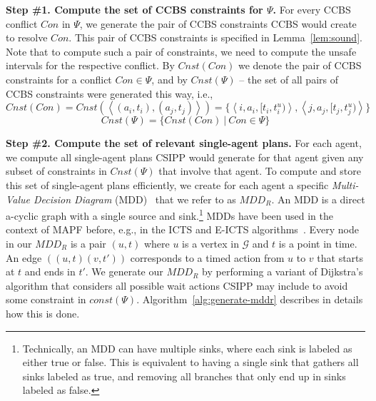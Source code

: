 \documentclass[review]{elsarticle}
\newcommand{\tuple}[1]{\ensuremath{\left \langle #1 \right \rangle }}
\newcommand{\mddr}{\ensuremath{MDD_R}\xspace}
\newcommand\konstantin[1]{\nb{\textbf{Konstantin:}}{red}{#1}}
\newcommand{\ccbs}{\ac{CCBS}\xspace}
\newcommand{\csipp}{\ac{CSIPP}\xspace}
\newcommand{\mapf}{\ac{MAPF}\xspace}
\newcommand{\const}{\textit{const}\xspace}
\begin{document}
\textbf{Step \#1. Compute the set of \ccbs constraints for $\Psi$.}
For every \ccbs conflict $Con$ in $\Psi$, we generate the pair of \ccbs constraints \ccbs would create to resolve $Con$. 
This pair of \ccbs constraints is specified in Lemma~\ref{lem:sound}. 
Note that to compute such a pair of constraints, we need to compute the unsafe intervals for the respective conflict. 
By $Cnst(Con)$ we denote the pair of \ccbs constraints for a conflict $Con\in \Psi$, 
and by $Cnst(\Psi)$ -- the set of all pairs of \ccbs constraints were generated this way, i.e., 
\begin{equation}
Cnst(Con) = Cnst(\tuple{ (a_i, t_i), (a_j,t_j) }) = \{ \tuple{i, a_i, [t_i, t_i^u)}, \tuple{j, a_j, [t_j, t_j^u)} \}
\end{equation}
\begin{equation}
Cnst(\Psi) = \{ Cnst(Con)~|~Con\in \Psi\} 
\end{equation}



\textbf{Step \#2. Compute the set of relevant single-agent plans.}
For each agent, we compute all single-agent plans \csipp would generate for that agent given any subset of constraints in $Cnst(\Psi)$ that involve that agent. 
To compute and store this set of single-agent plans efficiently, we create for each agent a 
specific \emph{Multi-Value Decision Diagram} (MDD)~\cite{srinivasan1990algorithms} that we refer to as \mddr. 
An MDD is a direct a-cyclic graph with a single source and sink.\footnote{Technically, an MDD can have multiple sinks, where each sink is labeled as either true or false. This is equivalent to having a single sink that gathers all sinks labeled as true, and removing all branches that only end up in sinks labeled as false.}
MDDs have been used in the context of \mapf before, e.g., in the ICTS and E-ICTS algorithms~\cite{sharon2013increasing,walker2018extended}. 
Every node in our \mddr is a pair $(u,t)$ where $u$ is a vertex in $\mathcal{G}$ 
and $t$ is a point in time. 
An edge $((u,t)(v,t'))$ corresponds to a timed action from $u$ to $v$ that starts at $t$ and ends in $t'$. We generate our \mddr by performing a variant of Dijkstra's algorithm that considers all possible wait actions \csipp may include to avoid some constraint in $\const(\Psi)$. 
Algorithm~\ref{alg:generate-mddr} describes in details how this is done. 
\end{document}
